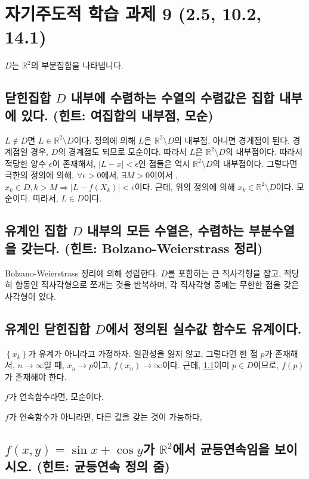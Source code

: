 \chapter{자기주도적 학습 과제 9 (2.5, 10.2, 14.1)}
$D$는 $\mathbb{R}^2$의 부분집합을 나타냅니다.
\section{닫힌집합 $D$ 내부에 수렴하는 수열의 수렴값은 집합 내부에 있다. (힌트: 여집합의 내부점, 모순)} \label{chap:sub}

$L \not\in D$면  $L \in \mathbb{R}^2 \setminus D$이다. 정의에 의해 $L$은 $\mathbb{R}^2 \setminus D$의 내부점, 아니면 경계점이 된다. 경계점일 경우, $D$의 경계점도 되므로 모순이다. 따라서 $L$은 $\mathbb{R}^2 \setminus D$의 내부점이다. 따라서 적당한 양수 $\epsilon$이 존재해서, $|L-x|<\epsilon$인 점들은 역시 $\mathbb{R}^2 \setminus D$의 내부점이다. 그렇다면
극한의 정의에 의해, $\forall \epsilon >0$에서, $\exists M > 0$이여서 , $x_k \in D, k>M \Rightarrow  \left|L - f(X_k)\right|<\epsilon$이다. 근데, 위의 정의에 의해 $x_k \in \mathbb{R}^2 \setminus D$이다. 모순이다.
따라서, $L \in D$이다.

\section{유계인 집합 $D$ 내부의 모든 수열은, 수렴하는 부분수열을 갖는다. (힌트: Bolzano-Weierstrass 정리)}
Bolzano-Weierstrass 정리에 의해 성립한다. $D$를 포함하는 큰 직사각형을 잡고, 적당히 합동인 직사각형으로 쪼개는 것을 반복하며, 각 직사각형 중에는 무한한 점을 갖은 사각형이 있다.

\section{유계인 닫힌집합 $D$에서 정의된 실수값 함수도 유계이다. }
$\left\{x_k \right\}$가 유계가 아니라고 가정하자. 일관성을 잃지 않고, 그렇다면 한 점 $p$가 존재해서, $n \to \infty$일 때, $x_n \to p$이고, $f(x_n) \to \infty$이다.
근데, \ref{chap:sub} 이미 $p \in D$이므로, $f(p)$가 존재해야 한다. 

$f$가 연속함수라면, 모순이다.

$f$가 연속함수가 아니라면, 다른 값을 갖는 것이 가능하다, 
\section{$f(x,y)=\sin x + \cos y$가 $\mathbb{R}^2$에서 균등연속임을 보이시오. (힌트: 균등연속 정의 줌)}
